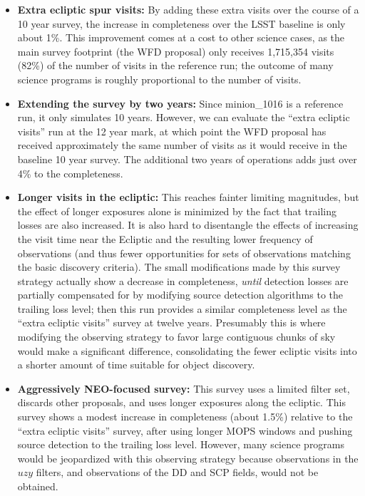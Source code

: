 \begin{itemize}
\item \textbf{Extra ecliptic spur visits:} By adding these extra visits over the course of a 10 year survey, the increase in completeness over the LSST baseline is only about 1\%. This improvement comes at a cost to other science cases, as the main survey footprint (the WFD proposal) only receives 1,715,354 visits (82\%) of the number of visits in the reference run; the outcome of many science programs is roughly proportional to the number of visits.
\item \textbf{Extending the survey by two years:} Since minion\_1016 is a reference run, it only simulates 10 years.
However, we can evaluate the ``extra ecliptic visits'' run at the 12 year mark, at which point the WFD proposal has received approximately the same number of visits as it would receive in the baseline 10 year survey. The additional two years of operations adds just over 4\% to the completeness.
\item \textbf{Longer visits in the ecliptic:} This reaches fainter limiting magnitudes, but the effect of longer exposures alone is minimized by the fact that trailing losses are also increased. It is also hard to disentangle the effects of increasing the visit time near the Ecliptic and the resulting lower frequency of observations (and thus fewer opportunities for sets of observations matching the basic discovery criteria). The small modifications made by this survey strategy actually show a decrease in completeness, {\it until} detection losses are partially compensated for by modifying source detection algorithms to the trailing loss level; then this run provides a similar completeness level as the ``extra ecliptic visits'' survey at twelve years. Presumably this is where modifying the observing strategy to favor large contiguous chunks of sky would make a significant difference, consolidating the fewer ecliptic visits into a shorter amount of time suitable for object discovery.
\item \textbf{Aggressively NEO-focused survey:} This survey uses a limited filter set, discards other proposals, and uses longer exposures along the ecliptic. This survey shows a modest increase in completeness (about 1.5\%) relative to the ``extra ecliptic visits'' survey, after using longer MOPS windows and pushing source detection to the trailing loss level.
However, many science programs would be jeopardized with this observing strategy because observations in the $uzy$ filters,
and observations of the DD and SCP fields, would not be obtained.
\end{itemize}

